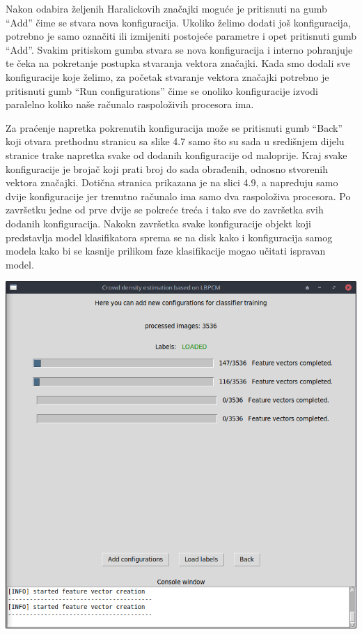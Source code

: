 \documentclass[times, utf8, zavrsni]{fer}
\begin{document}
\bigbreak

Nakon odabira željenih Haralickovih
značajki moguće je pritisnuti na gumb \enquote{Add} čime se stvara
nova konfiguracija. Ukoliko želimo dodati još konfiguracija, potrebno je samo
označiti ili izmijeniti postojeće parametre i opet pritisnuti gumb \enquote{Add}.
Svakim pritiskom gumba stvara se nova konfiguracija i interno pohranjuje te čeka na
pokretanje postupka stvaranja vektora značajki. Kada smo dodali sve konfiguracije
koje želimo, za početak stvaranje vektora značajki potrebno je pritisnuti gumb
\enquote{Run configurations} čime se onoliko konfiguracije izvodi paralelno koliko
naše računalo raspoloživih procesora ima. 

\bigbreak

Za praćenje napretka pokrenutih konfiguracija može se pritisnuti gumb 
\enquote{Back} koji otvara prethodnu stranicu sa slike 4.7 samo što su sada
u središnjem dijelu stranice trake napretka svake od dodanih konfiguracije od maloprije. 
Kraj svake konfiguracije je brojač koji prati broj do sada obrađenih, odnosno
stvorenih vektora značajki. Dotična stranica prikazana je na slici 4.9, a 
napreduju samo dvije konfiguracije jer trenutno računalo ima samo dva raspoloživa procesora.
Po završetku jedne od prve dvije se pokreće treća i tako sve do završetka svih 
dodanih konfiguracija. Nakokn završetka svake konfiguracije objekt koji predstavlja 
model klasifikatora sprema se na disk kako i konfiguracija samog modela kako
bi se kasnije prilikom faze klasifikacije mogao učitati ispravan model.

\begin{minipage}{\linewidth}
\centering
\includegraphics[scale=0.4]{img/fvc3.png}
\end{minipage}
\end{document}
